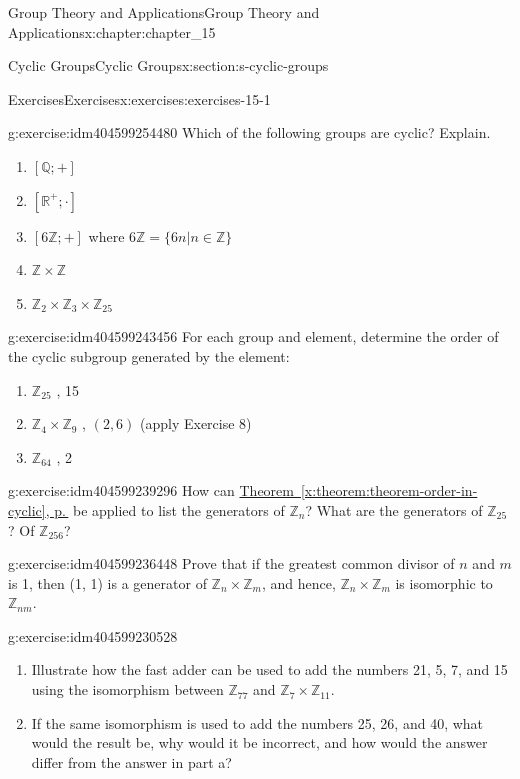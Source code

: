 \documentclass[twoside,10pt,]{book}
\newcommand{\xreffont}{\relax}
\numberwithin{equation}{section}
\begin{document}
\begin{chapterptx}{Group Theory and Applications}{}{Group Theory and Applications}{}{}{x:chapter:chapter_15}
\begin{sectionptx}{Cyclic Groups}{}{Cyclic Groups}{}{}{x:section:s-cyclic-groups}
\begin{exercises-subsection}{Exercises}{}{Exercises}{}{}{x:exercises:exercises-15-1}
\begin{divisionexercise}{5}{}{}{g:exercise:idm404599254480}
Which of the following groups are cyclic? Explain.%
\begin{enumerate}[label=(\alph*)]
\item{}\([\mathbb{Q}; +]\)%
\item{}\([\mathbb{R}^+;\cdot ]\)%
\item{}\([6\mathbb{Z}; +]\) where \(6\mathbb{Z} = \{6n |n \in  \mathbb{Z}\}\)%
\item{}\(\mathbb{Z} \times  \mathbb{Z}\)%
\item{}\(\mathbb{Z}_2\times  \mathbb{Z}_3 \times  \mathbb{Z}_{25}\)%
\end{enumerate}
%
\end{divisionexercise}%
\begin{divisionexercise}{6}{}{}{g:exercise:idm404599243456}%
For each group and element, determine the order of the cyclic subgroup generated by the element:%
\begin{enumerate}[label=(\alph*)]
\item{}\(\mathbb{Z}_{25}\) , 15%
\item{}\(\mathbb{Z}_4\times \mathbb{Z}_9\) , \((2, 6)\) (apply Exercise 8)%
\item{}\(\mathbb{Z}_{64}\) , 2%
\end{enumerate}
%
\end{divisionexercise}%
\begin{divisionexercise}{7}{}{}{g:exercise:idm404599239296}%
How can \hyperref[x:theorem:theorem-order-in-cyclic]{Theorem~{\xreffont\ref{x:theorem:theorem-order-in-cyclic}}, p.\,\pageref{x:theorem:theorem-order-in-cyclic}} be applied to list the generators of \(\mathbb{Z}_n\)? What are the generators of \(\mathbb{Z}_{25}\)? Of \(\mathbb{Z}_{256}\)?%
\end{divisionexercise}%
\begin{divisionexercise}{8}{}{}{g:exercise:idm404599236448}%
Prove that if the greatest common divisor of \(n\) and \(m\) is 1, then (1, 1) is a generator of \(\mathbb{Z}_n\times \mathbb{Z}_m\), and hence, \(\mathbb{Z}_n\times \mathbb{Z}_m\) is isomorphic to  \(\mathbb{Z}_{n m}\).%
\end{divisionexercise}%
\begin{divisionexercise}{9}{}{}{g:exercise:idm404599230528}%
%
\begin{enumerate}[label=(\alph*)]
\item{}Illustrate how the fast adder can be used to add the numbers 21, 5, 7, and 15 using the isomorphism between \(\mathbb{Z}_{77}\) and \(\mathbb{Z}_7\times \mathbb{Z}_{11}\).%
\item{}If the same isomorphism is used to add the numbers 25, 26, and 40, what would the result be, why would it be incorrect, and how would the answer differ from the answer in part a?%

\end{enumerate}
\end{divisionexercise}
\end{exercises-subsection}
\end{sectionptx}
\end{chapterptx}
\end{document}
